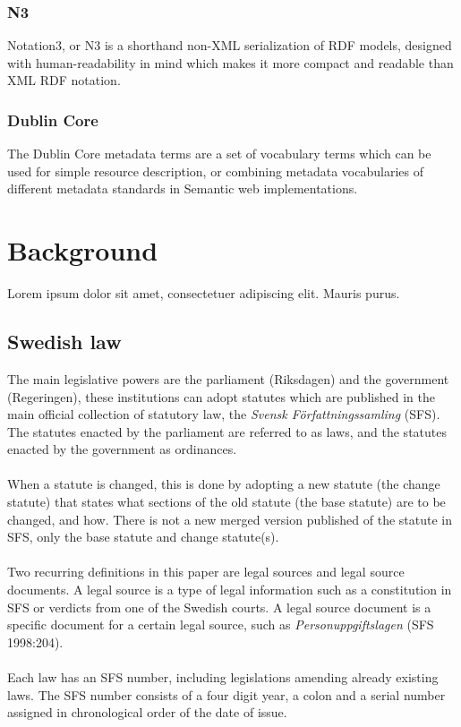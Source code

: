 \documentclass[a4paper,11pt]{kth-mag}
\begin{document}
\subsection*{N3}
Notation3, or N3 is a shorthand non-XML serialization of RDF models,
designed with human-readability in mind which makes it more compact and
readable than XML RDF notation.

\subsection*{Dublin Core}
The Dublin Core metadata terms are a set of vocabulary terms which
can be used for simple resource description, or combining metadata
vocabularies of different metadata standards in Semantic web implementations.

\chapter{Background}

Lorem ipsum dolor sit amet, consectetuer adipiscing elit. Mauris
purus. 

\section{Swedish law}
The main legislative powers are the parliament (Riksdagen) and the government (Regeringen), these institutions can adopt statutes which are published in the main official collection of statutory law, the \textit{Svensk Författningssamling} (SFS). The statutes enacted by the parliament are referred to as laws, and the statutes enacted by the government as ordinances.\\\\
When a statute is changed, this is done by adopting a new statute (the change statute) that states what sections of the old statute (the base statute) are to be changed, and how. There is not a new merged version published of the statute in SFS, only the base statute and change statute(s).\\\\
Two recurring definitions in this paper are legal sources and legal source documents. A legal source is a type of legal information such as a constitution in SFS or verdicts from one of the Swedish courts. A legal source document is a specific document for a certain legal source, such as \textit{Personuppgiftslagen} (SFS 1998:204).\\\\ 
Each law has an SFS number, including legislations amending already existing laws. The SFS number consists of a four digit year, a colon and a serial number assigned in chronological order of the date of issue. 
\end{document}
